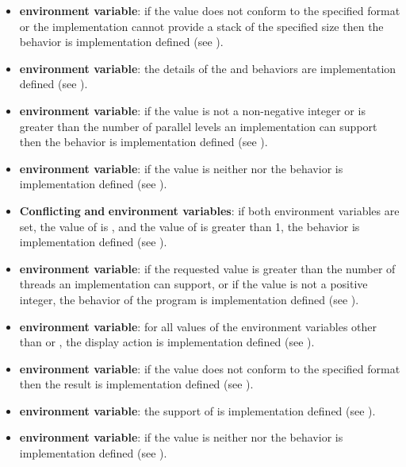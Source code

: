 \begin{itemize}
\item {} \textbf{environment variable}: if the value does not conform to the
specified format or the implementation cannot provide a stack of the specified size
then the behavior is implementation defined (see ).

\item {} \textbf{environment variable}: the details of the  and
 behaviors are implementation defined (see ).

\item {} \textbf{environment variable}: if the value is not a
non-negative integer or is greater than the number of parallel levels an implementation
can support then the behavior is implementation defined (see ).

\item {} \textbf{environment variable}: if the value is neither
 nor  the behavior is implementation defined (see
).

\item \textbf{Conflicting }  \textbf{and}  \textbf{environment
variables}: if both environment variables are set, the value of  is
, and the value of  is greater
than 1, the behavior is implementation defined (see ).

\item {} \textbf{environment variable}: if the requested value is greater than
the number of threads an implementation can support, or if the value is not a positive
integer, the behavior of the program is implementation defined (see ).

\item {} \textbf{environment variable}: for all values of the environment variables other than  or , the display action is implementation defined (see
).

\item {} \textbf{environment variable}: if the value does not
conform to the specified format then the result is implementation defined (see
).

\item {} \textbf{environment variable}: the support of  is implementation defined (see
).

\item {} \textbf{environment variable}: if the value is neither
 nor  the behavior is implementation defined (see
).

\end{itemize}



